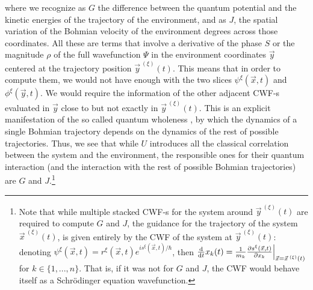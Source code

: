 \documentclass[11pt, a4paper]{article} %
\begin{document}
where we recognize as $G$ the difference between the quantum potential \cite{JordiXavier, Durr} and the kinetic energies of the trajectory of the environment, and as $J$, the spatial variation of the Bohmian velocity of the environment degrees across those coordinates. All these are terms that involve a derivative of the phase $S$ or the magnitude $\rho$ of the full wavefunction $\Psi$ in the environment coordinates $\vec{y}$ centered at the trajectory position $\vec{y}^{\:(\xi)}(t)$. This means that in order to compute them, we would not have enough with the two slices $\psi^\xi(\vec{x},t)$ and $\phi^\xi(\vec{y},t)$. We would require the information of the other adjacent CWF-s evaluated in $\vec{y}$ close to but not exactly in $\vec{y}^{\:(\xi)}(t)$. This is an explicit manifestation of the so called quantum wholeness \cite{JordiXavier}, by which the dynamics of a single Bohmian trajectory depends on the dynamics of the rest of possible trajectories. Thus, we see that while $U$ introduces all the classical correlation between the system and the environment, the responsible ones for their quantum interaction (and the interaction with the rest of possible Bohmian trajectories) are $G$ and $J$.\footnote{Note that while multiple stacked CWF-s for the system around $\vec{y}^{\:(\xi)}(t)$ are required to compute $G$ and $J$, the guidance for the trajectory of the system $\vec{x}^{\:(\xi)}(t)$, is given entirely by the CWF of the system at $\vec{y}^{\:(\xi)}(t)$: denoting $\psi^\xi (\vec{x},t)=r^\xi(\vec{x},t)e^{is^\xi(\vec{x},t)/\hbar}$, then $\dv{}{t}x_k(t)=\frac{1}{m_k}\pdv{s^\xi(\vec{x},t)}{x_k}\Big\rvert_{\vec{x}=\vec{x}^{\:(\xi)}(t)}$ for $k\in\{1,...,n\}$. That is, if it was not for $G$ and $J$, the CWF would behave itself as a Schrödinger equation wavefunction.}\vspace{-0.15cm}


\end{document}
